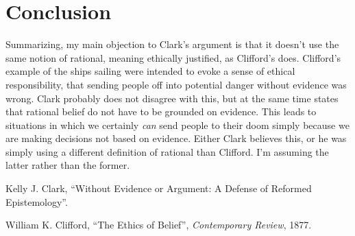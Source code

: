 \documentclass{article}
\begin{document}
\section{Conclusion}
Summarizing, my main objection to Clark's argument is that it doesn't use the same notion of rational, meaning ethically justified, as Clifford's does. Clifford's example of the ships sailing were intended to evoke a sense of ethical responsibility, that sending people off into potential danger without evidence was wrong. Clark probably does not disagree with this, but at the same time states that rational belief do not have to be grounded on evidence. This leads to situations in which we certainly \textit{can} send people to their doom simply because we are making decisions not based on evidence. Either Clark believes this, or he was simply using a different definition of rational than Clifford. I'm assuming the latter rather than the former.

\begin{thebibliography}{999}
  Kelly J. Clark,
  ``Without Evidence or Argument: A Defense of Reformed Epistemology''.

  William K. Clifford,
  ``The Ethics of Belief'', \emph{Contemporary Review}, 1877.
\end{thebibliography}
\end{document}
